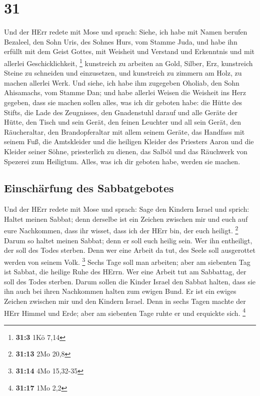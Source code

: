 \hypertarget{section-30}{%
\section{31}\label{section-30}}

 Und der HErr redete mit Mose und sprach: 
Siehe, ich habe mit Namen berufen Bezaleel, den Sohn Uris, des Sohnes
Hurs, vom Stamme Juda,  und habe ihn erfüllt mit dem Geist
Gottes, mit Weisheit und Verstand und Erkenntnis und mit allerlei
Geschicklichkeit, \footnote{\textbf{31:3} 1Kö 7,14} 
kunstreich zu arbeiten an Gold, Silber, Erz,  kunstreich
Steine zu schneiden und einzusetzen, und kunstreich zu zimmern am Holz,
zu machen allerlei Werk.  Und siehe, ich habe ihm
zugegeben Oholiab, den Sohn Ahisamachs, vom Stamme Dan; und habe
allerlei Weisen die Weisheit ins Herz gegeben, dass sie machen sollen
alles, was ich dir geboten habe:  die Hütte des Stifts,
die Lade des Zeugnisses, den Gnadenstuhl darauf und alle Geräte der
Hütte,  den Tisch und sein Gerät, den feinen Leuchter und
all sein Gerät, den Räucheraltar,  den Brandopferaltar mit
allem seinem Geräte, das Handfass mit seinem Fuß,  die
Amtskleider und die heiligen Kleider des Priesters Aaron und die Kleider
seiner Söhne, priesterlich zu dienen,  das Salböl und das
Räuchwerk von Spezerei zum Heiligtum. Alles, was ich dir geboten habe,
werden sie machen.

\hypertarget{einschuxe4rfung-des-sabbatgebotes}{%
\subsection{Einschärfung des
Sabbatgebotes}\label{einschuxe4rfung-des-sabbatgebotes}}

 Und der HErr redete mit Mose und sprach: 
Sage den Kindern Israel und sprich: Haltet meinen Sabbat; denn derselbe
ist ein Zeichen zwischen mir und euch auf eure Nachkommen, dass ihr
wisset, dass ich der HErr bin, der euch heiligt. \footnote{\textbf{31:13}
  2Mo 20,8}  Darum so haltet meinen Sabbat; denn er soll
euch heilig sein. Wer ihn entheiligt, der soll des Todes sterben. Denn
wer eine Arbeit da tut, des Seele soll ausgerottet werden von seinem
Volk. \footnote{\textbf{31:14} 4Mo 15,32-35}  Sechs Tage
soll man arbeiten; aber am siebenten Tag ist Sabbat, die heilige Ruhe
des HErrn. Wer eine Arbeit tut am Sabbattag, der soll des Todes sterben.
 Darum sollen die Kinder Israel den Sabbat halten, dass
sie ihn auch bei ihren Nachkommen halten zum ewigen Bund.
 Er ist ein ewiges Zeichen zwischen mir und den Kindern
Israel. Denn in sechs Tagen machte der HErr Himmel und Erde; aber am
siebenten Tage ruhte er und erquickte sich. \footnote{\textbf{31:17} 1Mo
  2,2}

